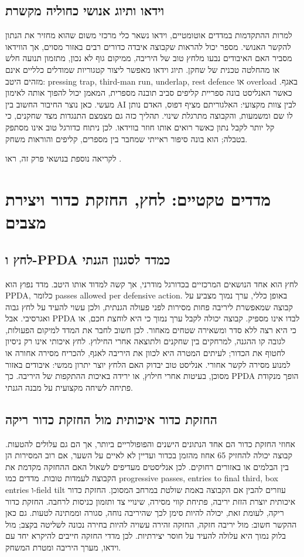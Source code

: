 \documentclass[11pt]{report}
\begin{document}
\section{וידאו ותיוג אנושי כחוליה מקשרת}
למרות ההתקדמות במדדים אוטומטיים, וידאו נשאר כלי מרכזי משום שהוא מחזיר את הנתון להקשר האנושי. מספר יכול להראות שקבוצה איבדה כדורים רבים באזור מסוים, אך הווידאו מסביר האם האיבודים נבעו מלחץ טוב של היריבה, ממיקום גוף לא נכון, מתזמון תנועה חלש או מהחלטה טכנית של שחקן. תיוג וידאו מאפשר ליצור קטגוריות שמודלים כלליים אינם מזהים היטב: pressing trap, third-man run, underlap, rest defence או overload באגף. כאשר האנליסט בונה ספריית קליפים סביב תובנה מספרית, המאמן יכול להפוך אותה לאימון מעשי. כאן נוצר החיבור החשוב בין AI לבין צוות מקצועי: האלגוריתם מציף דפוס, האדם נותן לו שם ומשמעות, והקבוצה מתרגלת שינוי. תהליך כזה גם מצמצם התנגדות מצד שחקנים, כי קל יותר לקבל נתון כאשר רואים אותו חוזר בווידאו. לכן ניתוח כדורגל טוב אינו מסתפק בטבלה; הוא בונה סיפור ראייתי שמחבר בין מספרים, קליפים והוראות משחק.

לקריאה נוספת בנושאי פרק זה, ראו \cite{langchain_docs}.

\chapter{מדדים טקטיים: לחץ, החזקת כדור ויצירת מצבים}
\section{לחץ ו-PPDA כמדד לסגנון הגנתי}
לחץ הוא אחד הנושאים המרכזיים בכדורגל מודרני, אך קשה למדוד אותו היטב. מדד נפוץ הוא PPDA, כלומר passes allowed per defensive action. באופן כללי, ערך נמוך מצביע על קבוצה שמאפשרת ליריבה פחות מסירות לפני פעולה הגנתית, ולכן עשוי להעיד על לחץ גבוה ואגרסיבי. אבל PPDA לבדו אינו מספיק. קבוצה יכולה לקבל ערך נמוך כי היא לוחצת חכם, או כי היא רצה ללא סדר ומשאירה שטחים מאחור. לכן חשוב לחבר את המדד למיקום הפעולות, לגובה קו ההגנה, למרחקים בין שחקנים ולתוצאה אחרי החילוץ. לחץ איכותי אינו רק ניסיון לחטוף את הכדור; לעיתים המטרה היא לכוון את היריבה לאגף, להכריח מסירה אחורה או למנוע מסירה לקשר אחורי. אנליסט טוב יבדוק האם הלחץ יוצר יתרון ממשי: איבודים באזור מסוכן, בעיטות אחרי חילוץ, או ירידה באיכות ההתקפות של היריבה. כך PPDA הופך מנקודת פתיחה לשיחה מקצועית על מבנה הגנתי.

\section{החזקת כדור איכותית מול החזקת כדור ריקה}
אחוזי החזקת כדור הם אחד הנתונים הישנים והפופולריים ביותר, אך הם גם עלולים להטעות. קבוצה יכולה להחזיק 65 אחוז מהזמן בכדור ועדיין לא לאיים על השער, אם רוב המסירות הן בין הבלמים או באזורים רחוקים. לכן אנליסטים מעדיפים לשאול האם ההחזקה מקדמת את הקבוצה לעמדות טובות. מדדים כמו progressive passes, entries to final third, box entries ו-field tilt עוזרים להבין אם הקבוצה באמת שולטת במרחב המסוכן. החזקת כדור איכותית יוצרת הזזת יריבה, פתיחת קווי מסירה, שינויי צד ותזמון כניסות לרחבה. החזקת כדור ריקה, לעומת זאת, יכולה להיות סימן לכך שהיריבה נוחה, סגורה וממתינה לטעות. גם כאן ההקשר חשוב: מול יריבה חזקה, החזקה זהירה עשויה להיות בחירה נכונה לשליטה בקצב; מול בלוק נמוך היא עלולה להעיד על חוסר יצירתיות. לכן מדדי החזקה חייבים להיקרא יחד עם וידאו, מערך היריבה ומטרת המשחק.
\end{document}
